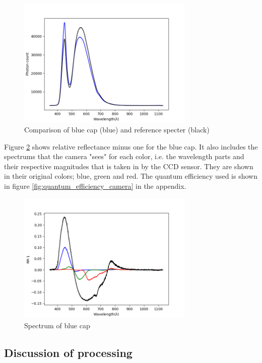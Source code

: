 \begin{figure}[h]
    \centering
    \includegraphics[width=0.75\textwidth]{Plots/blue_cap_original_spectrum_and_background.png}
    \caption{Comparison of blue cap (blue) and reference specter (black)}
    \label{fig:blue_cap_and_reference_spectrum}
\end{figure}


Figure \ref{fig:blue_cap_spectrum} shows relative reflectance minus one for the blue cap. It also includes the spectrums that the camera "sees" for each color, i.e. the wavelength parts and their respective magnitudes that is taken in by the CCD sensor. They are shown in their original colors; blue, green and red. The quantum efficiency used is shown in figure \ref{fig:quantum_efficiency_camera} in the appendix. 

\begin{figure}[h]
    \centering
    \includegraphics[width=0.75\textwidth]{Plots/blue_cap_rr_minus_one_with_qe.png}    
    \caption{Spectrum of blue cap}
    \label{fig:blue_cap_spectrum}
\end{figure}


\subsection{Discussion of processing}

